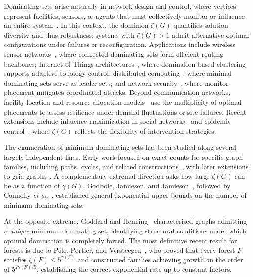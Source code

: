 \documentclass[11pt]{article}
\theoremstyle{definition}
\theoremstyle{remark}
\newcommand{\gam}{\gamma}
\newcommand{\zet}{\zeta}
\begin{document}
Dominating sets arise naturally in network design and control, where vertices represent facilities,
sensors, or agents that must collectively monitor or influence an entire system~\cite{HaynesHedetniemiSlater1998}.
In this context, the dominion $\zet(G)$ quantifies solution diversity and thus robustness:
systems with $\zet(G)>1$ admit alternative optimal configurations under failures or reconfiguration.
Applications include wireless sensor networks~\cite{AnithaSebastian2011,Wu1999,Dai2004}, where connected
dominating sets form efficient routing backbones; Internet of Things architectures~\cite{Bendouda2018,Jia2009},
where domination-based clustering supports adaptive topology control; distributed computing~\cite{Kuhn2004},
where minimal dominating sets serve as leader sets; and network security~\cite{Angel2022,Kang2008}, where
monitor placement mitigates coordinated attacks. Beyond communication networks, facility location and
resource allocation models~\cite{Church1974,Farahani2010} use the multiplicity of optimal placements to
assess resilience under demand fluctuations or site failures. Recent extensions include influence
maximization in social networks~\cite{Li2013} and epidemic control~\cite{Gao2014}, where $\zet(G)$ reflects
the flexibility of intervention strategies.

The enumeration of minimum dominating sets has been studied along several largely independent lines.
Early work focused on exact counts for specific graph families, including paths, cycles, and related
constructions~\cite{AllaganBobga2021}, with later extensions to grid graphs~\cite{SuAllagan2024}.
A complementary extremal direction asks how large $\zet(G)$ can be as a function of $\gam(G)$.
Godbole, Jamieson, and Jamieson~\cite{GodboleJamiesonJamieson2014}, followed by Connolly
\emph{et al.}~\cite{ConnollyGaborGodboleKay2016}, established general exponential upper bounds on the
number of minimum dominating sets.

At the opposite extreme, Goddard and Henning~\cite{GoddardHenning2023} characterized graphs admitting a
\emph{unique} minimum dominating set, identifying structural conditions under which optimal domination
is completely forced. The most definitive recent result for forests is due to Petr, Portier, and
Versteegen~\cite{PetrPortierVersteegen2024}, who proved that every forest $F$ satisfies
$\zet(F)\le 5^{\gam(F)}$ and constructed families achieving growth on the order of
$5^{2\gam(F)/5}$, establishing the correct exponential rate up to constant factors.
\end{document}
